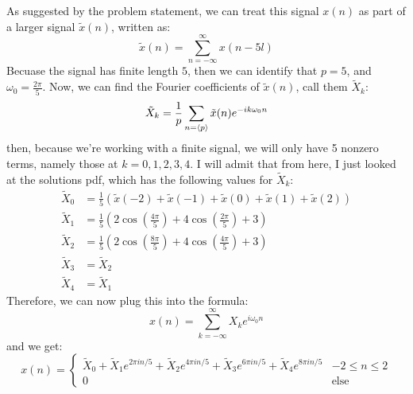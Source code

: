 \documentclass[10pt]{article}
\begin{document}
\begin{enumerate}[label=\alph*)]
			\begin{solution}
				As suggested by the problem statement, we can treat this signal \( x(n) \) as part of a 
				larger signal \( \tilde x(n) \), written as:
				\[
				\tilde x(n) = \sum_{n=-\infty}^{\infty} x(n - 5l)
				\] 
				Becuase the signal has finite length \( 5 \), then we can identify that \( p = 5 \), and 
				\( \omega_0 = \frac{2\pi}{5} \). 
				Now, we can find the Fourier coefficients of \( \tilde x(n) \), call them \( \tilde X_k \):
				\[
				\tilde X_k = \frac{1}{p}\sum_{n=\langle p \rangle} \tilde x(n) e^{-i k \omega_0 n}
				\] 
				then, because we're working with a finite signal, we will only have 5 nonzero terms, namely 
				those at \( k = 0, 1, 2, 3, 4 \). I will admit that from here, I just looked at the solutions 
				pdf, which has the following values for \( \tilde X_k \):
				\begin{align*}
					\tilde X_0 &= \frac{1}{5}(\tilde x(-2) + \tilde x(-1) + \tilde x(0) + \tilde x(1) + \tilde x(2))\\
					\tilde X_1 &= \frac{1}{5}\left( 2 \cos\left( \frac{4\pi}{5} \right) + 4\cos\left( \frac{2\pi}{5} \right)  + 3 \right)  \\
					\tilde X_2 &= \frac{1}{5}\left( 2 \cos\left( \frac{8\pi}{5} \right)  + 4\cos\left( \frac{4\pi}{5} \right) + 3 \right)  \\
					\tilde X_3 &=  \tilde X_2 \\
					\tilde X_4 &= \tilde X_1 
				\end{align*}
				Therefore, we can now plug this into the formula:
				\[
				x(n) = \sum_{k=-\infty}^{\infty} X_k e^{i \omega_0 n}
				\] 
				and we get:
				\[
				x(n) = \begin{cases}
					\tilde X_0 + \tilde X_1 e^{2 \pi i n / 5} + \tilde X_2 e^{4 \pi i n / 5} + 
					\tilde X_3 e^{6 \pi i n / 5} + \tilde X_4 e^{8 \pi i n / 5} & -2 \le n \le 2\\
					0 & \text{else}
				\end{cases}
				\] 
			\end{solution}
	 \end{enumerate}
\end{document}

